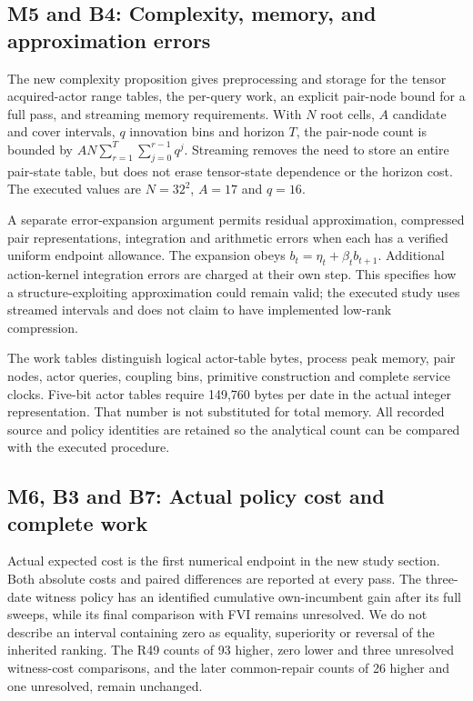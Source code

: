 \hypertarget{m5-and-b4-complexity-memory-and-approximation-errors}{%
\subsection{M5 and B4: Complexity, memory, and approximation
errors}\label{m5-and-b4-complexity-memory-and-approximation-errors}}

The new complexity proposition gives preprocessing and storage for the
tensor acquired-actor range tables, the per-query work, an explicit
pair-node bound for a full pass, and streaming memory requirements. With
\(N\) root cells, \(A\) candidate and cover intervals, \(q\) innovation
bins and horizon \(T\), the pair-node count is bounded by
\(AN\sum_{r=1}^{T}\sum_{j=0}^{r-1}q^j\). Streaming removes the need to
store an entire pair-state table, but does not erase tensor-state
dependence or the horizon cost. The executed values are \(N=32^2\),
\(A=17\) and \(q=16\).

A separate error-expansion argument permits residual approximation,
compressed pair representations, integration and arithmetic errors when
each has a verified uniform endpoint allowance. The expansion obeys
\(b_t=\eta_t+\beta_tb_{t+1}\). Additional action-kernel integration
errors are charged at their own step. This specifies how a
structure-exploiting approximation could remain valid; the executed
study uses streamed intervals and does not claim to have implemented
low-rank compression.

The work tables distinguish logical actor-table bytes, process peak
memory, pair nodes, actor queries, coupling bins, primitive construction
and complete service clocks. Five-bit actor tables require 149,760 bytes
per date in the actual integer representation. That number is not
substituted for total memory. All recorded source and policy identities
are retained so the analytical count can be compared with the executed
procedure.

\hypertarget{m6-b3-and-b7-actual-policy-cost-and-complete-work}{%
\subsection{M6, B3 and B7: Actual policy cost and complete
work}\label{m6-b3-and-b7-actual-policy-cost-and-complete-work}}

Actual expected cost is the first numerical endpoint in the new study
section. Both absolute costs and paired differences are reported at
every pass. The three-date witness policy has an identified cumulative
own-incumbent gain after its full sweeps, while its final comparison
with FVI remains unresolved. We do not describe an interval containing
zero as equality, superiority or reversal of the inherited ranking. The
R49 counts of 93 higher, zero lower and three unresolved witness-cost
comparisons, and the later common-repair counts of 26 higher and one
unresolved, remain unchanged.

